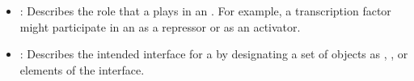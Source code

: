 \begin{itemize}
\item \emph{}:
Describes the role that a  plays in an .
For example, a transcription factor might participate in an  as a repressor or as an activator.

\item \emph{}:
Describes the intended interface for a  by designating a set of  objects as , , or  elements of the interface.


\end{itemize}
